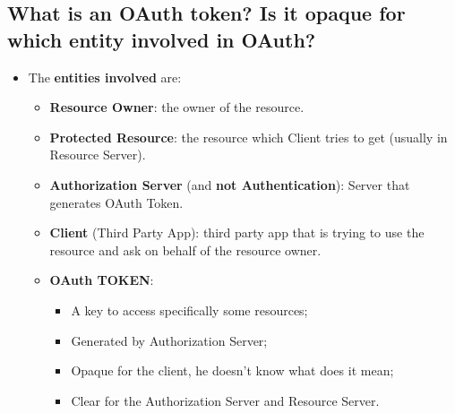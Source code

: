 \documentclass[9pt, letterpaper]{article}
\begin{document}
\subsection{What is an OAuth token? Is it opaque for which entity involved in OAuth?}
\begin{itemize}
	\item The \textbf{entities involved} are:
	      \begin{itemize}
		      \item \textbf{Resource Owner}: the owner of the resource.
		      \item \textbf{Protected Resource}: the resource which Client tries to get (usually in Resource Server).
		      \item \textbf{Authorization Server} (and \textbf{not Authentication}): Server that generates OAuth Token.
		      \item \textbf{Client} (Third Party App): third party app that is trying to use the resource and ask on behalf of the resource owner.
		      \item \textbf{OAuth TOKEN}:
		            \begin{itemize}
			            \item A key to access specifically some resources;
			            \item Generated by Authorization Server;
			            \item Opaque for the client, he doesn't know what does it mean;
			            \item Clear for the Authorization Server and Resource Server.
		            \end{itemize}
	      \end{itemize}
\end{itemize}

\newpage
\end{document}
